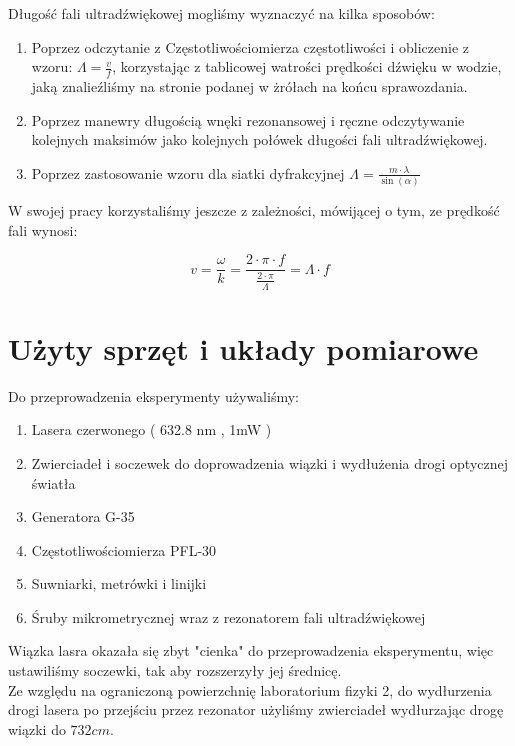 \documentclass[a4paper,12pt]{article}
\begin{document}
Długość fali ultradźwiękowej mogliśmy wyznaczyć na kilka sposobów:
\begin{enumerate}
  \item Poprzez odczytanie z Częstotliwościomierza częstotliwości i obliczenie z wzoru: $\Lambda=\frac{v}{f}$, korzystając z tablicowej watrości prędkości dźwięku w wodzie, jaką znalieźliśmy na stronie podanej w żrółach na końcu sprawozdania. 
  \item Poprzez manewry długością wnęki rezonansowej i ręczne odczytywanie kolejnych maksimów jako kolejnych połówek długości fali ultradźwiękowej.
  \item Poprzez zastosowanie wzoru dla siatki dyfrakcyjnej $\Lambda=\frac{m \cdot \lambda}{\sin (\alpha)}$
\end{enumerate}

W swojej pracy korzystaliśmy jeszcze z zależności, mówijącej o tym, ze prędkość fali wynosi: 

$$v = \frac{\omega}{k} = \frac{2\cdot \pi \cdot f }{\frac{2\cdot \pi}{\Lambda} }= \Lambda \cdot f $$





\section{Użyty sprzęt i układy pomiarowe}



Do przeprowadzenia eksperymenty używaliśmy: 

\begin{enumerate}
  \item Lasera czerwonego ( 632.8 nm , 1mW ) 
  \item Zwierciadeł i soczewek do doprowadzenia wiązki i wydłużenia drogi optycznej światła
  \item Generatora G-35
  \item Częstotliwościomierza PFL-30
  \item Suwniarki, metrówki i linijki  
  \item Śruby mikrometrycznej wraz z rezonatorem fali ultradźwiękowej
\end{enumerate}

Wiązka lasra okazała się zbyt "cienka" do przeprowadzenia eksperymentu, więc ustawiliśmy soczewki, tak aby rozszerzyły jej średnicę. \\
Ze względu na ograniczoną powierzchnię laboratorium fizyki 2, do wydłurzenia drogi lasera po przejściu przez rezonator użyliśmy zwierciadeł wydłurzając drogę wiązki do $732cm$. 
\end{document}
